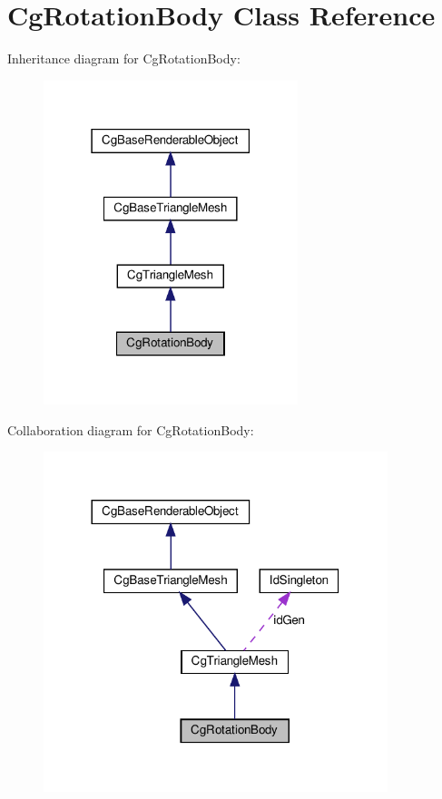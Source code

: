 \hypertarget{class_cg_rotation_body}{}\section{Cg\+Rotation\+Body Class Reference}
\label{class_cg_rotation_body}


Inheritance diagram for Cg\+Rotation\+Body\+:
\nopagebreak
\begin{figure}[H]
\begin{center}
\leavevmode
\includegraphics[width=210pt]{class_cg_rotation_body__inherit__graph}
\end{center}
\end{figure}


Collaboration diagram for Cg\+Rotation\+Body\+:
\nopagebreak
\begin{figure}[H]
\begin{center}
\leavevmode
\includegraphics[width=284pt]{class_cg_rotation_body__coll__graph}
\end{center}
\end{figure}
